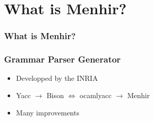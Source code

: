\section{What is Menhir?}
\setcounter{subsection}{1}

\begin{frame}
\frametitle{What is Menhir?}
\end{frame}


\begin{frame}
  \frametitle{Grammar Parser Generator}
  \begin{itemize}
    \item Developped by the INRIA
    \item Yacc $\rightarrow$ Bison $\Leftrightarrow$ ocamlyacc $\rightarrow$ Menhir
    \item Many improvements
  \end{itemize}
\end{frame}

